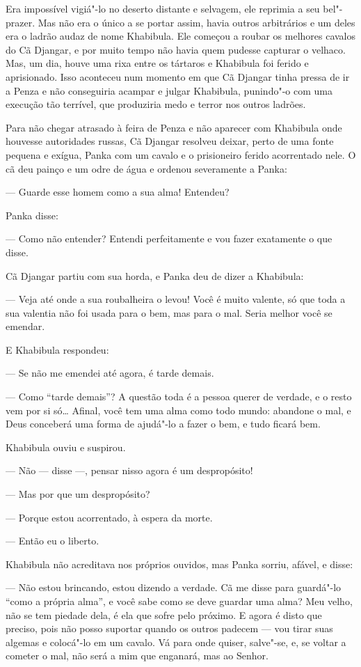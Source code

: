 Era impossível vigiá"-lo no deserto distante e selvagem, ele reprimia a
seu bel"-prazer. Mas não era o único a se portar assim, havia outros
arbitrários e um deles era o ladrão audaz de nome Khabibula. Ele começou
a roubar os melhores cavalos do Cã Djangar, e por muito tempo não havia
quem pudesse capturar o velhaco. Mas, um dia, houve uma rixa entre os
tártaros e Khabibula foi ferido e aprisionado. Isso aconteceu num
momento em que Cã Djangar tinha pressa de ir a Penza e não conseguiria
acampar e julgar Khabibula, punindo"-o com uma execução tão terrível, que
produziria medo e terror nos outros ladrões.

Para não chegar atrasado à feira de Penza e não aparecer com Khabibula
onde houvesse autoridades russas, Cã Djangar resolveu deixar, perto de
uma fonte pequena e exígua, Panka com um cavalo e o prisioneiro ferido
acorrentado nele. O cã deu painço e um odre de água e ordenou
severamente a Panka:

--- Guarde esse homem como a sua alma! Entendeu?

Panka disse:

--- Como não entender? Entendi perfeitamente e vou fazer exatamente o
que disse.

Cã Djangar partiu com sua horda, e Panka deu de dizer a Khabibula:

--- Veja até onde a sua roubalheira o levou! Você é muito valente, só
que toda a sua valentia não foi usada para o bem, mas para o mal. Seria
melhor você se emendar.

E Khabibula respondeu:

--- Se não me emendei até agora, é tarde demais.

--- Como ``tarde demais''? A questão toda é a pessoa querer de verdade,
e o resto vem por si só\ldots{} Afinal, você tem uma alma como todo mundo:
abandone o mal, e Deus conceberá uma forma de ajudá"-lo a fazer o bem, e
tudo ficará bem.

Khabibula ouviu e suspirou.

--- Não --- disse ---, pensar nisso agora é um despropósito!

--- Mas por que um despropósito?

--- Porque estou acorrentado, à espera da morte.

--- Então eu o liberto.

Khabibula não acreditava nos próprios ouvidos, mas Panka sorriu, afável,
e disse:

--- Não estou brincando, estou dizendo a verdade. Cã me disse para
guardá"-lo ``como a própria alma'', e você sabe como se deve guardar uma
alma? Meu velho, não se tem piedade dela, é ela que sofre pelo próximo.
E agora é disto que preciso, pois não posso suportar quando os outros
padecem --- vou tirar suas algemas e colocá"-lo em um cavalo. Vá para
onde quiser, salve"-se, e, se voltar a cometer o mal, não será a mim que
enganará, mas ao Senhor.

